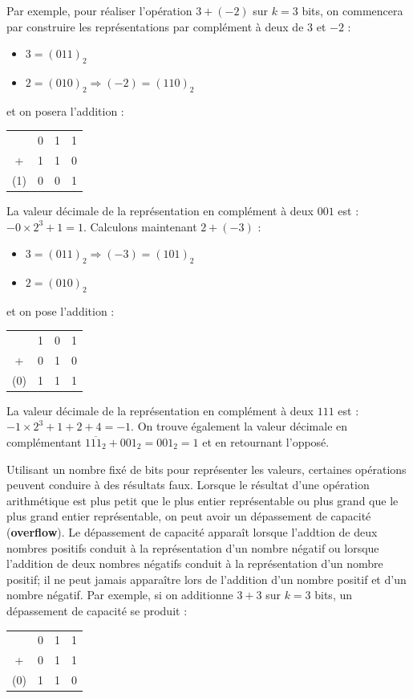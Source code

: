 Par exemple, pour réaliser l'opération $3 + (-2)$ sur $k=3$ bits, on commencera par construire les représentations par complément à deux de $3$ et $-2$ :
\begin{itemize}
\item[] $3 = (011)_2$
\item[] $2 = (010)_2 \Rightarrow (-2) = (110)_2$
\end{itemize}
et on posera l'addition :

\begin{tabular}{cccc}
& 0 & 1 & 1\\
+& 1 & 1 & 0 \\
\hline
(1) & 0 & 0 & 1
\end{tabular}

La valeur décimale de la représentation en complément à deux $001$ est : $-0\times 2^3 + 1 = 1$. Calculons maintenant $2 + (-3)$ :
\begin{itemize}
\item[] $3 = (011)_2 \Rightarrow (-3) = (101)_2$
\item[] $2 = (010)_2$
\end{itemize}
et on pose l'addition :

\begin{tabular}{cccc}
& 1 & 0 & 1\\
+& 0 & 1 & 0 \\
\hline
(0) & 1 & 1 & 1
\end{tabular}

La valeur décimale de la représentation en complément à deux $111$ est : $-1\times 2^3 + 1 + 2 + 4 = -1$. On trouve également la valeur décimale en complémentant $\overline{111_2} + 001_2= 001_2 = 1$ et en retournant l'opposé.

Utilisant un nombre fixé de bits pour représenter les valeurs, certaines opérations peuvent conduire à des résultats faux. Lorsque le résultat d'une opération arithmétique est plus petit que le plus entier représentable ou plus grand que le plus grand entier représentable, on peut avoir un dépassement de capacité (\textbf{overflow}). Le dépassement de capacité apparaît lorsque l'addtion de deux nombres positifs conduit à la représentation d'un nombre négatif ou lorsque l'addition de deux nombres négatifs conduit à la représentation d'un nombre positif; il ne peut jamais apparaître lors de l'addition d'un nombre positif et d'un nombre négatif. Par exemple, si on additionne $3 + 3$ sur $k=3$ bits, un dépassement de capacité se produit :

\begin{tabular}{cccc}
& 0 & 1 & 1\\
+& 0 & 1 & 1 \\
\hline
(0) & 1 & 1 & 0
\end{tabular}

